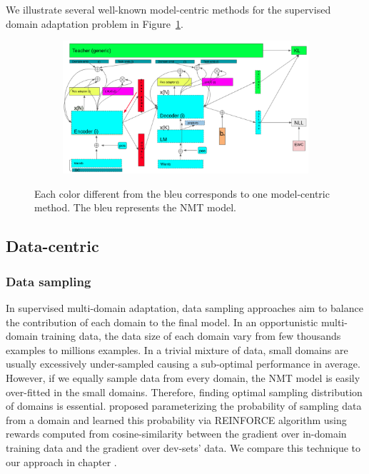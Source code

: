 We illustrate several well-known model-centric methods for the supervised domain adaptation problem in Figure~\ref{fig:model-centric-case1-case2}.
\begin{figure}[htbp]
\begin{subfigure}{1.0\textwidth}
  \centering
  \includegraphics[width=1.0\textwidth]{graphics/supervised_mdmt}
\end{subfigure}
\newline
\begin{subfigure}{1.0\textwidth}
  \centering
\end{subfigure}
\caption{Each color different from the bleu corresponds to one model-centric method. The bleu represents the NMT model.}
\label{fig:model-centric-case1-case2}
\end{figure}

\subsection{Data-centric}
\subsubsection{Data sampling}
In supervised multi-domain adaptation, data sampling approaches aim to balance the contribution of each domain to the final model. In an opportunistic multi-domain training data, the data size of each domain vary from few thousands examples to millions examples. In a trivial mixture of data, small domains are usually excessively under-sampled causing a sub-optimal performance in average. However, if we equally sample data from every domain, the NMT model is easily over-fitted in the small domains. Therefore, finding optimal sampling distribution of domains is essential. \cite{Wang20balancing} proposed parameterizing the probability of sampling data from a domain and learned this probability via REINFORCE algorithm \citet{Williams92simple} using rewards computed from cosine-similarity between the gradient over in-domain training data and the gradient over dev-sets' data. We compare this technique to our approach in chapter .


